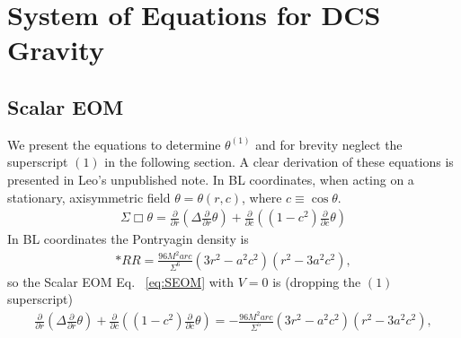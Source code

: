 \documentclass[aps,prd,amsmath,showpacs,amssymb,superscriptaddress,nofootinbib,longbibliography,eqsecnum,preprintnumbers]{revtex4-1}
\begin{document}
%


\section{System of Equations for DCS Gravity}

\subsection{Scalar EOM}
We present the equations to determine $\theta^{(1)}$ and for brevity neglect the superscript $(1)$ in the following section. A clear derivation of these equations is presented in Leo's unpublished note.
In BL coordinates, when acting on a stationary, axisymmetric field $\theta =\theta(r, c)$, where $c \equiv \cos\theta$.
\begin{align}
\Sigma \Box \theta= \frac{\partial}{\partial r}\left(\Delta \frac{\partial }{\partial r}\theta\right) + \frac{\partial}{\partial c}\left((1-c^2) \frac{\partial }{\partial c}\theta\right)
\end{align}
In BL coordinates the Pontryagin density is
\begin{align}
*RR=\frac{96M^2 ar c }{\Sigma^6}(3r^2-a^2c^2)(r^2-3a^2c^2),
\end{align}
so the Scalar EOM Eq.~ \eqref{eq:SEOM} with $V=0$ is (dropping the $(1)$ superscript)
\begin{align}
 \frac{\partial}{\partial r}\left(\Delta \frac{\partial }{\partial r}\theta\right) + \frac{\partial}{\partial c}\left((1-c^2) \frac{\partial }{\partial c}\theta\right)=-\frac{96M^2 ar c }{\Sigma^5}(3r^2-a^2c^2)(r^2-3a^2c^2),
\end{align}
\end{document}
